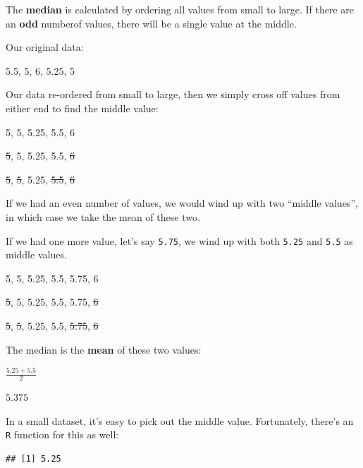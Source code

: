 \documentclass[
]{book}
\newenvironment{Shaded}{\begin{snugshade}}{\end{snugshade}}
\newcommand{\DocumentationTok}[1]{\textcolor[rgb]{0.56,0.35,0.01}{\textbf{\textit{#1}}}}
\newcommand{\FloatTok}[1]{\textcolor[rgb]{0.00,0.00,0.81}{#1}}
\newcommand{\FunctionTok}[1]{\textcolor[rgb]{0.13,0.29,0.53}{\textbf{#1}}}
\newcommand{\NormalTok}[1]{#1}
\newcommand{\SpecialCharTok}[1]{\textcolor[rgb]{0.81,0.36,0.00}{\textbf{#1}}}
\begin{document}
The \textbf{median} is calculated by ordering all values from small to large. If there are an \textbf{odd} numberof values, there will be a single value at the middle.

Our original data:

5.5, 5, 6, 5.25, 5

Our data re-ordered from small to large, then we simply cross off values from either end to find the middle value:

5, 5, 5.25, 5.5, 6

\st{5}, 5, 5.25, 5.5, \st{6}

\st{5}, \st{5}, 5.25, \st{5.5}, \st{6}

If we had an even number of values, we would wind up with two ``middle values'', in which case we take the mean of these two.

If we had one more value, let's say \texttt{5.75}, we wind up with both \texttt{5.25} and \texttt{5.5} as middle values.

5, 5, 5.25, 5.5, 5.75, 6

\st{5}, 5, 5.25, 5.5, 5.75, \st{6}

\st{5}, \st{5}, 5.25, 5.5, \st{5.75}, \st{6}

The median is the \textbf{mean} of these two values:

\(\frac{5.25+5.5}{2}\)

\(5.375\)

In a small dataset, it's easy to pick out the middle value. Fortunately, there's an \texttt{R} function for this as well:

\begin{Shaded}
\end{Shaded}

\begin{verbatim}
## [1] 5.25
\end{verbatim}

\begin{Shaded}
\end{Shaded}
\end{document}
